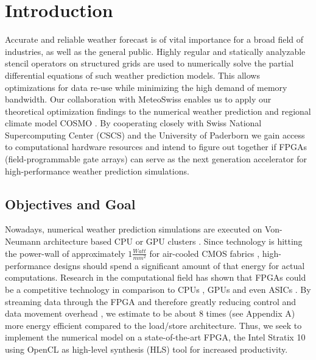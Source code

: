 \chapter{Introduction}
Accurate and reliable weather forecast is of vital importance for a broad field of industries, as well as the general public. Highly regular and statically analyzable stencil operators \cite{label6} on structured grids  are used to numerically solve the partial differential equations of such weather prediction models. This allows optimizations for data re-use while minimizing the high demand of memory bandwidth. Our collaboration with MeteoSwiss \cite{label37} enables us to apply our theoretical optimization findings to the numerical weather prediction and regional climate model COSMO \cite{label15, label38}. By cooperating closely with Swiss National Supercomputing Center (CSCS) \cite{label39} and the University of Paderborn we gain access to computational hardware resources and intend to figure out together if FPGAs (field-programmable gate arrays) can serve as the next generation accelerator for high-performance weather prediction simulations.


\section{Objectives and Goal}
Nowadays, numerical weather prediction simulations are executed on Von-Neumann architecture \cite{label35} based CPU or GPU clusters \cite{label13}. Since technology is hitting the power-wall of approximately $1 \frac{Watt}{mm^2}$ for air-cooled CMOS fabrics \cite{label1}, high-performance designs should spend a significant amount of that energy for actual computations. Research in the computational field has shown that FPGAs could be a competitive technology in comparison to CPUs \cite{label7}, GPUs \cite{label16} and even ASICs \cite{label8}. By streaming data through the FPGA and therefore greatly reducing control and data movement overhead \cite{label1,label31}, we estimate to be about 8 times (see Appendix A) more energy efficient compared to the load/store architecture. Thus, we seek to implement the numerical model on a state-of-the-art FPGA, the Intel Stratix 10 \cite{label25} using OpenCL \cite{label21} as high-level synthesis (HLS) tool \cite{label18,label36} for increased productivity.


